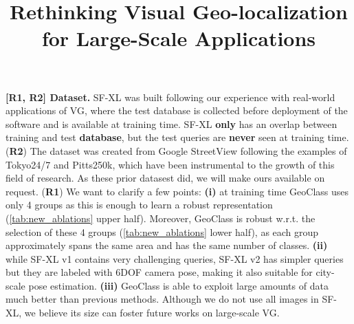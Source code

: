 \documentclass[10pt,twocolumn,letterpaper]{article}
\newcommand{\RI}{{\color{red}\textbf{R1}}}
\newcommand{\RII}{{\color{ForestGreen}\textbf{R2}}}
\newcommand{\myparagraph}[1]{\vspace{-0.5pt}\noindent\textbf{#1}}
\begin{document}
\title{Rethinking Visual Geo-localization for Large-Scale Applications}  

\maketitle
\thispagestyle{empty}
\appendix

\noindent






\myparagraph{[{\RI, \RII}] Dataset.} 
SF-XL was built following our experience with real-world applications of VG, where the test database is collected before deployment of the software and is available at training time. SF-XL \textbf{only} has an overlap between training and test \textbf{database}, but the test queries are \textbf{never} seen at training time.
({\RII}) The dataset was created from Google StreetView following the examples of Tokyo24/7 and Pitts250k, which have been instrumental to the growth of this field of research. As these prior datasest did, we will make ours available on request.
({\RI}) We want to clarify a few points:
\textbf{(i)} at training time GeoClass uses only 4 groups as this is enough to learn a robust representation (\cref{tab:new_ablations} upper half).
Moreover, GeoClass is robust w.r.t. the selection of these 4 groups (\cref{tab:new_ablations} lower half), as each group approximately spans the same area and has the same number of classes.
\textbf{(ii)} while SF-XL v1 contains very challenging queries, SF-XL v2 has simpler queries but they are labeled with 6DOF camera pose, making it also suitable for city-scale pose estimation.
\textbf{(iii)} GeoClass is able to exploit large amounts of data much better than previous methods. Although we do not use all images in SF-XL, we believe its size can foster future works on large-scale VG. 
\end{document}
